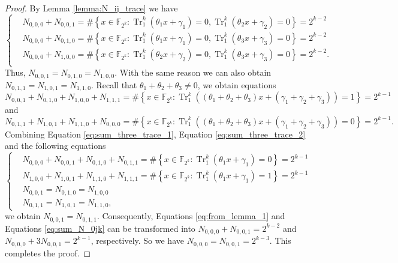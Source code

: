 \documentclass[preprint,10pt]{elsarticle}
\newcommand{\F}{\mathbb{F}}
\newcommand{\0}{\textbf{0}}
\newcommand{\1}{\textbf{1}}
\newcommand{\TRACE}{\operatorname{Tr}_1^k}
\theoremstyle{plain}
\begin{document}
    \begin{proof}
        By Lemma \ref{lemma:N_ij_trace} we have
        \begin{equation}\label{eq:from_lemma_1}\left\{\begin{alignedat}{3}
        &N_{0,0,0}+N_{0,0,1}=\#\left\{x\in\F_{2^k} : \TRACE\left(\theta_1x+\gamma_1\right)=0, \TRACE\left(\theta_2x+\gamma_2\right)=0\right\}=2^{k-2}\\
        &N_{0,0,0}+N_{0,1,0}=\#\left\{x\in\F_{2^k} : \TRACE\left(\theta_1x+\gamma_1\right)=0, \TRACE\left(\theta_3x+\gamma_3\right)=0\right\}=2^{k-2}\\
        &N_{0,0,0}+N_{1,0,0}=\#\left\{x\in\F_{2^k} : \TRACE\left(\theta_2x+\gamma_2\right)=0, \TRACE\left(\theta_3x+\gamma_3\right)=0\right\}=2^{k-2}.\\
        \end{alignedat}\right.\end{equation}
        Thus, $N_{0,0,1}=N_{0,1,0}=N_{1,0,0}$. With the same reason we can also obtain  $N_{0,1,1}=N_{1,0,1}=N_{1,1,0}$.
        Recall that $\theta_1+\theta_2+\theta_3\ne 0$, we obtain equations
        \begin{equation}\label{eq:sum_three_trace_1}
            N_{0,0,1}+N_{0,1,0}+N_{1,0,0}+N_{1,1,1}=\#\left\{x\in\F_{2^k} : \TRACE\left(\left(\theta_1+\theta_2+\theta_3\right)x+\left(\gamma_1+\gamma_2+\gamma_3\right)\right)=1\right\}=2^{k-1}
        \end{equation}
        and
        \begin{equation}\label{eq:sum_three_trace_2}
            N_{0,1,1}+N_{1,0,1}+N_{1,1,0}+N_{0,0,0}=\#\left\{x\in\F_{2^k} : \TRACE\left(\left(\theta_1+\theta_2+\theta_3\right)x+\left(\gamma_1+\gamma_2+\gamma_3\right)\right)=0\right\}=2^{k-1}.
        \end{equation}
        Combining Equation \eqref{eq:sum_three_trace_1}, Equation \eqref{eq:sum_three_trace_2} and the following equations
        \begin{equation}\label{eq:sum_N_0jk}\left\{\begin{alignedat}{2}
            &N_{0,0,0}+N_{0,0,1}+N_{0,1,0}+N_{0,1,1}=\#\left\{x\in\F_{2^k} : \TRACE\left(\theta_1x+\gamma_1\right)=0\right\}=2^{k-1}\\
            &N_{1,0,0}+N_{1,0,1}+N_{1,1,0}+N_{1,1,1}=\#\left\{x\in\F_{2^k} : \TRACE\left(\theta_1x+\gamma_1\right)=1\right\}=2^{k-1}\\
            &N_{0,0,1}=N_{0,1,0}=N_{1,0,0}\\
            &N_{0,1,1}=N_{1,0,1}=N_{1,1,0},
        \end{alignedat}\right.\end{equation}
        we obtain $N_{0,0,1}=N_{0,1,1}$.
        Consequently, Equations \eqref{eq:from_lemma_1} and Equations \eqref{eq:sum_N_0jk} can be transformed into
        $N_{0,0,0}+N_{0,0,1}=2^{k-2}$ and $N_{0,0,0}+3N_{0,0,1}=2^{k-1}$, respectively.
        So we have $N_{0,0,0}=N_{0,0,1}=2^{k-3}$. This completes the proof.
    \end{proof}
\end{document}
